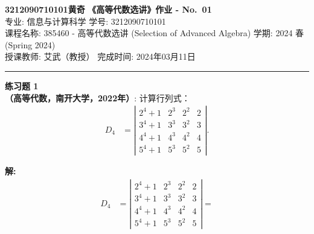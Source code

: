 \documentclass[a4paper, 11pt]{article}
\newenvironment{problem}[2][练习题]
    { \begin{mdframed}[backgroundcolor=gray!5] \textbf{#1 #2} \\}
    {  \end{mdframed}}
\newenvironment{solution}
    {\textbf{解:}}
    {}
\begin{document}
\noindent
\large\textbf{3212090710101\quad 黄奇} \hfill \textbf{《高等代数选讲》作业 - No.~\Huge{01}}   \\
专业: 信息与计算科学 \hfill 学号: 3212090710101 \\
\normalsize 课程名称: 385460 - 高等代数选讲 (Selection of Advanced Algebra) \hfill 学期: 2024 春 (Spring 2024)\\
授课教师: 艾武（教授） \hfill 完成时间: 2024年03月11日 \\
\noindent\rule{7in}{1.8pt}

\begin{problem}{1}
\textbf{（高等代数，南开大学，2022年）}: 计算行列式：
\begin{align*}
D_{4} & = \left|\begin{array}{llll}
2^{4}+1 & 2^{3} & 2^{2} & 2 \\
3^{4}+1 & 3^{3} & 3^{2} & 3 \\
4^{4}+1 & 4^{3} & 4^{2} & 4 \\
5^{4}+1 & 5^{3} & 5^{2} & 5
\end{array}\right| .
\end{align*}
\end{problem}

\begin{solution}
\begin{align*}
D_{4} & = \left|\begin{array}{llll}
2^{4}+1 & 2^{3} & 2^{2} & 2 \\
3^{4}+1 & 3^{3} & 3^{2} & 3 \\
4^{4}+1 & 4^{3} & 4^{2} & 4 \\
5^{4}+1 & 5^{3} & 5^{2} & 5
\end{array}\right|
=
\end{align*}
\end{solution} 

\end{document}
